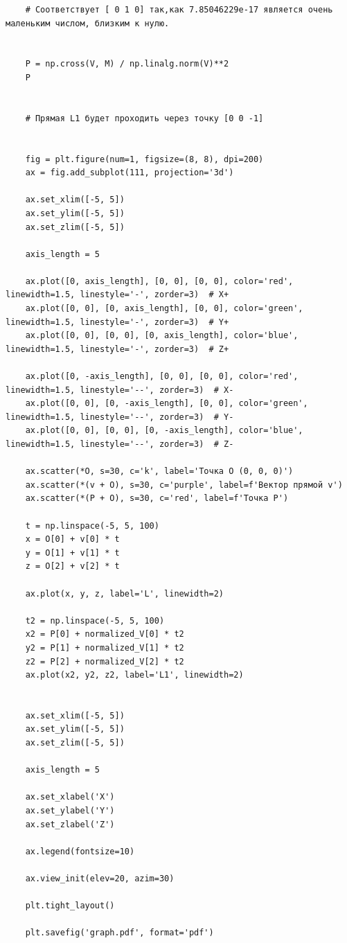 \begin{verbatim}
    # Соответствует [ 0 1 0] так,как 7.85046229e-17 является очень маленьким числом, близким к нулю.


    P = np.cross(V, M) / np.linalg.norm(V)**2
    P


    # Прямая L1 будет проходить через точку [0 0 -1] 


    fig = plt.figure(num=1, figsize=(8, 8), dpi=200)
    ax = fig.add_subplot(111, projection='3d')

    ax.set_xlim([-5, 5])
    ax.set_ylim([-5, 5])
    ax.set_zlim([-5, 5])

    axis_length = 5

    ax.plot([0, axis_length], [0, 0], [0, 0], color='red', linewidth=1.5, linestyle='-', zorder=3)  # X+
    ax.plot([0, 0], [0, axis_length], [0, 0], color='green', linewidth=1.5, linestyle='-', zorder=3)  # Y+
    ax.plot([0, 0], [0, 0], [0, axis_length], color='blue', linewidth=1.5, linestyle='-', zorder=3)  # Z+

    ax.plot([0, -axis_length], [0, 0], [0, 0], color='red', linewidth=1.5, linestyle='--', zorder=3)  # X-
    ax.plot([0, 0], [0, -axis_length], [0, 0], color='green', linewidth=1.5, linestyle='--', zorder=3)  # Y-
    ax.plot([0, 0], [0, 0], [0, -axis_length], color='blue', linewidth=1.5, linestyle='--', zorder=3)  # Z-

    ax.scatter(*O, s=30, c='k', label='Точка O (0, 0, 0)')
    ax.scatter(*(v + O), s=30, c='purple', label=f'Вектор прямой v')
    ax.scatter(*(P + O), s=30, c='red', label=f'Точка P')

    t = np.linspace(-5, 5, 100)  
    x = O[0] + v[0] * t
    y = O[1] + v[1] * t
    z = O[2] + v[2] * t

    ax.plot(x, y, z, label='L', linewidth=2)

    t2 = np.linspace(-5, 5, 100)
    x2 = P[0] + normalized_V[0] * t2 
    y2 = P[1] + normalized_V[1] * t2 
    z2 = P[2] + normalized_V[2] * t2 
    ax.plot(x2, y2, z2, label='L1', linewidth=2)


    ax.set_xlim([-5, 5])
    ax.set_ylim([-5, 5])
    ax.set_zlim([-5, 5])

    axis_length = 5

    ax.set_xlabel('X')
    ax.set_ylabel('Y')
    ax.set_zlabel('Z')

    ax.legend(fontsize=10)

    ax.view_init(elev=20, azim=30)

    plt.tight_layout()

    plt.savefig('graph.pdf', format='pdf')


\end{verbatim}
